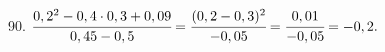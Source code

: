 90. $\cfrac{0,2^2-0,4\cdot 0,3+0,09}{0,45-0,5}=\cfrac{(0,2-0,3)^2}{-0,05}=\cfrac{0,01}{-0,05}=-0,2.$\\
